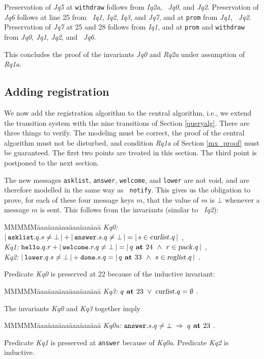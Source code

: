 \documentclass[10pt]{article} \usepackage[english]{babel}
\newenvironment{tab}{\begin{tabbing}
MMMMM\=aaa\=aaa\=aaa\=aaa\=aaa\=aaa\= \kill}{\end{tabbing}}
\def\S #1/{\mbox {\textsl{#1}}}
\def\B #1/{\mbox {\textbf{#1}}}
\def\T #1/{\mbox {\texttt{#1}}}
\def\Implies{\;\Rightarrow\;}
\def\Land   {\mbox{ $\;\land\;$ }}
\def\Lor    {\;\lor\;}
\begin{document}
Preservation of \S Jq5/ at \T withdraw/ follows from \S Iq2a/, \S
Jq0/, and \S Jq2/.  Preservation of \S Jq6/ follows at line 25 from \S
Iq1/, \S Iq2/, \S Iq3/, and \S Jq7/, and at \T prom/ from \S Jq1/, \S
Jq2/.  Preservation of \S Jq7/ at 25 and 28 follows from \S Iq1/, and
at \T prom/ and \T withdraw/ from \S Jq0/, \S Jq1/, \S Jq2/, and \S
Jq6/.

This concludes the proof of the invariants \S Jq0/ and \S Rq2a/ under
assumption of \S Rq1a/.

\subsection {Adding registration} \label{queryadd}

We now add the registration algorithm to the central algorithm, i.e.,
we extend the transition system with the nine transitions of Section
\ref{queryalg}.  There are three things to verify. The modeling must
be correct, the proof of the central algorithm must not be disturbed,
and condition \S Rq1a/ of Section \ref{mx_proof} must be guaranteed.
The first two points are treated in this section.  The third point is
postponed to the next section.

The new messages \T asklist/, \T answer/, \T welcome/, and \T lower/
are not void, and are therefore modelled in the same way as \T
notify/.  This gives us the obligation to prove, for each of these
four message keys $m$, that the value of $m$ is $\bot$ whenever a
message $m$ is sent.  This follows from the invariants (similar to \S
Iq2/):
\begin{tab}
  \S Kq0:/ \> $|\, \T asklist/.q.s\ne\bot\,| + |\,\T answer/.s.q
  \ne\bot\,| = | \, s\in\S curlist/.q\, | $ ,\\
  \S Kq1:/ \> $ \T hello/.q.r + |\,\T welcome/.r.q\ne\bot\,| = 
  |\, q\B\ at /24\Land r\in\S pack/.q\, | $ ,\\
  \S Kq2:/ \> $|\, \T lower/.q.s\ne\bot\,| + \T done/.s.q
  = | \, q \B\ at /33 \Land s\in\S reglist/.q\, | $ .
\end{tab}
Predicate \S Kq0/ is preserved at 22 because of the inductive invariant:
\begin{tab}
\S Kq3:/ \> $ q\B\ at /23\Lor \S curlist/.q  = \emptyset $ .
\end{tab}
The invariants \S Kq0/ and \S Kq3/ together imply
\begin{tab}
\S Kq0a:/ \> $ \T answer/.s.q\ne\bot \Implies q\B\ at /23 $ .
\end{tab}
Predicate \S Kq1/ is preserved at \T answer/ because of \S Kq0a/.
Predicate \S Kq2/ is inductive.
\end{document}
